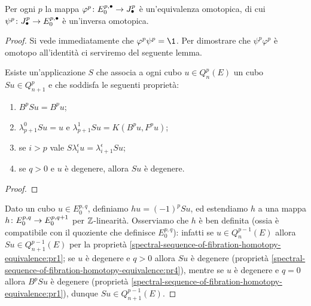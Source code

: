\begin{proposition}
Per ogni $p$ la mappa $\varphi^p\colon E^{p,\bullet}_0\to J^p_\bullet$ è un'equivalenza omotopica, di cui $\psi^p\colon J^p_\bullet\to E^{p,\bullet}_0$ è un'inversa omotopica.
\end{proposition}
\begin{proof}
Si vede immediatamente che $\varphi^p\psi^p=\1$. Per dimostrare che $\psi^p\varphi^p$ è omotopo all'identità ci serviremo del seguente lemma.
\begin{lemma*}
Esiste un'applicazione $S$  che associa a ogni cubo $u\in Q^p_n(E)$ un cubo $Su\in Q^p_{n+1}$ e che soddisfa le seguenti proprietà:
\begin{enumerate}
\item\label{spectral-sequence-of-fibration-homotopy-equivalence:pr1} $B^pSu=B^pu$;
\item\label{spectral-sequence-of-fibration-homotopy-equivalence:pr2} $\lambda^0_{p+1}Su=u$ e $\lambda^1_{p+1}Su=K(B^pu,F^pu)$;
\item\label{spectral-sequence-of-fibration-homotopy-equivalence:pr3} se $i>p$ vale $S\lambda^\epsilon_iu=\lambda^\epsilon_{i+1}Su$;
\item\label{spectral-sequence-of-fibration-homotopy-equivalence:pr4} se $q>0$ e $u$ è degenere, allora $Su$ è degenere.
\end{enumerate}
\end{lemma*}
\begin{proof}

\end{proof}
Dato un cubo $u\in E^{p,q}_0$, definiamo $hu=(-1)^pSu$, ed estendiamo $h$ a una mappa
$h\colon E^{p,q}_0\to E^{p,q+1}_0$ per $\mathbb{Z}$-linearità. Osserviamo che $h$ è ben definita (ossia è compatibile con il quoziente che definisce $E^{p,q}_0$): infatti se $u\in Q^{p-1}_n(E)$ allora $Su\in Q^{p-1}_{n+1}(E)$ per la proprietà \ref{spectral-sequence-of-fibration-homotopy-equivalence:pr1}; se $u$ è degenere e $q>0$ allora $Su$ è degenere (proprietà \ref{spectral-sequence-of-fibration-homotopy-equivalence:pr4}), mentre se $u$ è degenere e $q=0$ allora $B^pSu$ è degenere (proprietà \ref{spectral-sequence-of-fibration-homotopy-equivalence:pr1}), dunque $Su\in Q^{p-1}_{n+1}(E)$.


\end{proof}
